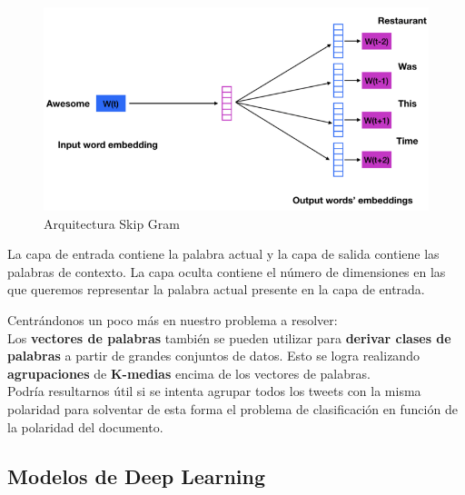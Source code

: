 \documentclass[a4paper,12pt]{report}
\begin{document}
\begin{itemize}
\begin{figure}[htbp!]
\centering
\includegraphics[scale=0.4]{images/skip.png}
\caption{Arquitectura Skip Gram}
\end{figure}
\vspace{2mm}

La capa de entrada contiene la palabra actual y la capa de salida contiene las palabras de contexto. La capa oculta contiene el número de dimensiones en las que queremos representar la palabra actual presente en la capa de entrada. 

\end{itemize}

\vspace{6mm}
{\setlength{\parindent}{0cm}
Centrándonos un poco más en nuestro problema a resolver:}
\vspace{2mm}\\
Los \textbf{vectores de palabras} también se pueden utilizar para \textbf{derivar clases de palabras} a partir de grandes conjuntos de datos. Esto se logra realizando \textbf{agrupaciones} de \textbf{K-medias} encima de los vectores de palabras. 
\vspace{2mm}\\
Podría resultarnos útil si se intenta agrupar todos los tweets con la misma polaridad para solventar de esta forma el problema de clasificación en función de la polaridad del documento. 


\subsection{Modelos de Deep Learning}
\end{document}
